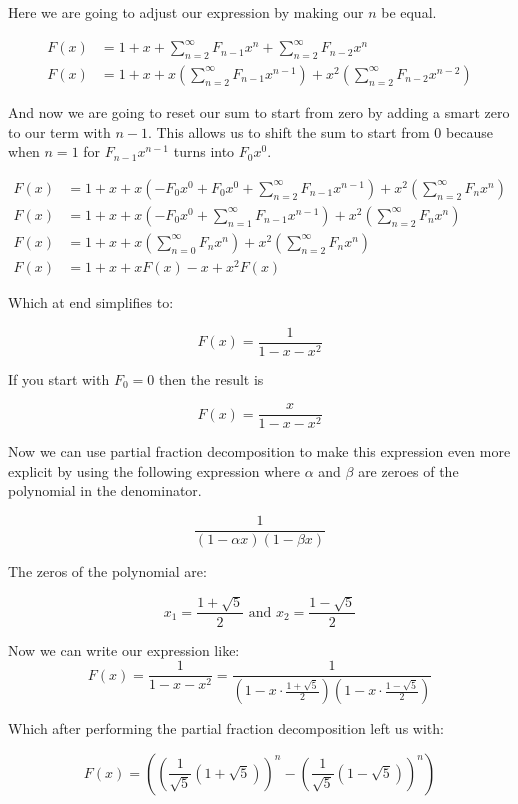 Here we are going to adjust our expression by making our \(n\) be equal.

\begin{align*}
    F(x) &= 1 + x + \sum_{n = 2}^{\infty} F_{n -1} x^{n} + \sum_{n = 2}^{\infty} F_{n - 2}x^n \\ 
    F(x) &= 1 + x + x \left( \sum_{n = 2}^{\infty} F_{n -1} x^{n-1}\right) + x^2 \left( \sum_{n = 2}^{\infty} F_{n -2} x^{n-2}\right)
\end{align*}

And now we are going to reset our sum to start from zero by adding a smart zero to our term with 
\(n - 1\). This allows us to shift the sum to start from 0 because when \(n = 1\) for 
\(F_{n - 1}x^{n - 1}\) turns into \(F_0 x^0\).

\begin{align*}
    F(x) &= 1 + x + x \left( -F_{0}x^0 + F_{0}x^0 + \sum_{n = 2}^{\infty} F_{n-1} x^{n-1}\right) + x^2 \left( \sum_{n = 2}^{\infty} F_{n} x^{n}\right)\\
    F(x) &= 1 + x + x \left( -F_{0}x^0 + \sum_{n = 1}^{\infty} F_{n-1} x^{n-1}\right) + x^2 \left( \sum_{n = 2}^{\infty} F_{n} x^{n}\right)\\
    F(x) &= 1 + x + x \left( \sum_{n = 0}^{\infty} F_{n} x^{n}\right) + x^2 \left( \sum_{n = 2}^{\infty} F_{n} x^{n}\right)\\
    F(x) &= 1 + x + x F(x) - x + x^2 F(x)
\end{align*}

Which at end simplifies to:

\[
    F(x) = \frac{1}{1 - x - x^2}
\]

If you start with \(F_0 = 0\) then the result  is

\[
    F(x) = \frac{x}{1 - x - x^2}
\]


Now we can use partial fraction decomposition to make this expression even more explicit
by using the following expression where \(\alpha\) and \(\beta\) are zeroes of the polynomial in the
denominator.

\[
    \frac{1}{\left(1 - \alpha x\right)\left(1 - \beta x\right)}
\]

The zeros of the polynomial are:

\[
    x_1 = \frac{1 + \sqrt{5}}{2} \text{ and }  x_2 = \frac{1 - \sqrt{5}}{2}    
\]


Now we can write our expression like:
\[
    F(x) = \frac{1}{1 - x - x^2} = \frac{1}{\left(1 - x \cdot \frac{1 + \sqrt{5}}{2}\right)\left(1 - x 
    \cdot \frac{1 - \sqrt{5}}{2}\right)}
\]

Which after performing the partial fraction decomposition left us with:

\[
    F(x) = \left( {\left( \frac{1}{\sqrt{5}} (1 + \sqrt{5}) \right)}^n - {\left( \frac{1}{\sqrt{5}} 
    (1 - \sqrt{5}) \right)}^n \right)
\]

\QED


